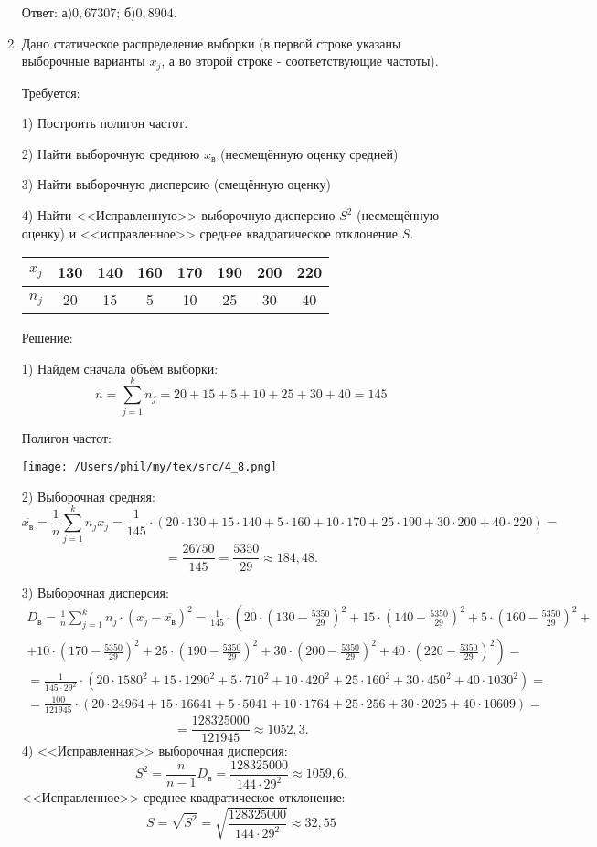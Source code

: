 \documentclass{article}
\begin{document}
\begin{enumerate}
Ответ: а)$0,67307$; б)$0,8904$.

\item %
Дано статическое распределение выборки (в первой строке указаны выборочные варианты $x_j$, а во второй строке - соответствующие частоты).

Требуется:

1) Построить полигон частот.

2) Найти выборочную среднюю $x_\textit{в}$ (несмещённую оценку средней)

3) Найти выборочную дисперсию (смещённую оценку)

4) Найти <<Исправленную>> выборочную дисперсию $S^2$ (несмещённую оценку) и <<исправленное>> среднее квадратическое отклонение $S$.

\begin{center}
\begin{tabular}{|c|c|c|c|c|c|c|c|}
\hline
$x_j$ & 130 & 140 & 160 & 170 & 190 & 200 & 220 \\
\hline
$n_j$ & 20 & 15 & 5 & 10 & 25 & 30 & 40 \\
\hline
\end{tabular}
\end{center}
\begin{center}Решение:\end{center}
1) Найдем сначала объём выборки: $$n=\sum_{j=1}^k n_j=20+15+5+10+25+30+40=145$$

Полигон частот:

\texttt{[image: /Users/phil/my/tex/src/4\_8.png]}

2) Выборочная средняя:
$$\overline{x_\textit{в}}=\frac{1}{n}\sum_{j=1}^k n_j x_j=\frac{1}{145}\cdot\left(20\cdot130+15\cdot140+5\cdot160+10\cdot170+25\cdot190+30\cdot200+40\cdot220\right)=$$
$$=\frac{26750}{145}=\frac{5350}{29}\approx184,48.$$

3) Выборочная дисперсия:
\begin{multline*}
D_{\textit{в}}=\frac{1}{n}\sum_{j=1}^k n_j
\cdot\left(x_j-\overline{x_\textit{в}}\right)^2=
\frac{1}{145}\cdot\left(20\cdot\left(130-\frac{5350}{29}\right)^2+15\cdot\left(140-\frac{5350}{29}\right)^2+5\cdot\left(160-\frac{5350}{29}\right)^2+\right.\\
+\left.10\cdot\left(170-\frac{5350}{29}\right)^2+25\cdot\left(190-\frac{5350}{29}\right)^2+30\cdot\left(200-\frac{5350}{29}\right)^2+40\cdot\left(220-\frac{5350}{29}\right)^2\right)=\\
=\frac{1}{145\cdot29^2}\cdot\left(20\cdot1580^2+15\cdot1290^2+5\cdot710^2+10\cdot420^2+25\cdot160^2+30\cdot450^2+40\cdot1030^2\right)=\\
=\frac{100}{121945}\cdot\left(20\cdot24964+15\cdot16641+5\cdot5041+10\cdot1764+25\cdot256+30\cdot2025+40\cdot10609\right)=
\end{multline*}
$$=\frac{128325000}{121945}\approx1052,3.$$
4) <<Исправленная>> выборочная дисперсия:
$$S^2=\frac{n}{n-1}D_{\textit{в}}=\frac{128325000}{144\cdot29^2}\approx1059,6.$$
<<Исправленное>> среднее квадратическое отклонение:
$$S=\sqrt{S^2}=\sqrt{\frac{128325000}{144\cdot29^2}}\approx32,55$$


\end{enumerate}
\end{document}
